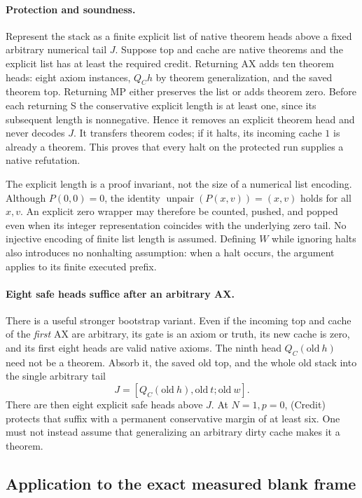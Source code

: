 \paragraph{Protection and soundness.}
Represent the stack as a finite explicit list of native theorem heads
above a fixed arbitrary numerical tail $J$.  Suppose top and cache are
native theorems and the explicit list has at least the required credit.
Returning AX adds ten theorem heads: eight axiom instances, $Q_Ch$ by
theorem generalization, and the saved theorem top.  Returning MP either
preserves the list or adds theorem zero.  Before each returning S the
conservative explicit length is at least one, since its subsequent
length is nonnegative.  Hence it removes an explicit theorem head and
never decodes $J$.  It transfers theorem codes; if it halts, its incoming
cache $1$ is already a theorem.  This proves that every halt on the
protected run supplies a native refutation.

The explicit length is a proof invariant, not the size of a numerical
list encoding.  Although $P(0,0)=0$, the identity
$\operatorname{unpair}(P(x,v))=(x,v)$ holds for all $x,v$.  An explicit
zero wrapper may therefore be counted, pushed, and popped even when its
integer representation coincides with the underlying zero tail.  No
injective encoding of finite list length is assumed.  Defining $W$ while
ignoring halts also introduces no nonhalting assumption: when a halt
occurs, the argument applies to its finite executed prefix.

\paragraph{Eight safe heads suffice after an arbitrary AX.}
There is a useful stronger bootstrap variant.  Even if the incoming
top and cache of the \emph{first} AX are arbitrary, its gate is an axiom
or truth, its new cache is zero, and its first eight heads are valid
native axioms.  The ninth head $Q_C(\mathrm{old}\ h)$ need not be a
theorem.  Absorb it, the saved old top, and the whole old stack into
the single arbitrary tail
\[
                     J=[Q_C(\mathrm{old}\ h),\mathrm{old}\ t;
                                                       \mathrm{old}\ w].
\]
There are then eight explicit safe heads above $J$.  At $N=1,p=0$,
(Credit) protects that suffix with a permanent conservative margin of
at least six.  One must not instead assume that generalizing an arbitrary
dirty cache makes it a theorem.

\subsection{Application to the exact measured blank frame}

